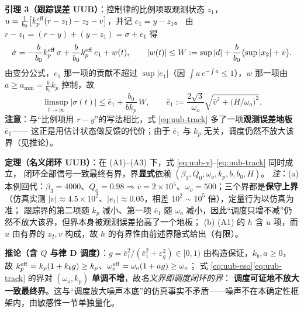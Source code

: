 \documentclass[11pt,a4paper]{article}
\theoremstyle{remark}\newtheorem{remark}{注}
\begin{document}
\noindent\textbf{引理 3（跟踪误差 UUB）}：控制律的比例项取观测状态 $z_1$，
$u=\frac{1}{b_0}\bigl[k_p^{\rm eff}(r-z_1)-z_2-v\bigr]$，并记 $e_1=y-z_1$。
由 $r-z_1=(r-y)+(y-z_1)=\sigma+e_1$ 得
\begin{equation}
\dot\sigma=-\frac{b}{b_0}k_p^{\rm eff}\,\sigma+\frac{b}{b_0}k_p^{\rm eff}\,e_1+w(t),
\qquad
|w(t)|\le W:=\sup|d|+\frac{b}{b_0}\bigl(\sup|x_2|+\bar v\bigr).
\label{eq:sig}
\end{equation}
由变分公式，$e_1$ 那一项的贡献不超过 $\sup|e_1|$（因 $\int a\,e^{-\int a}\le1$），$w$ 那一项由 $a\ge a_{\min}=\frac{b}{b_0}k_p$ 控制，故
\begin{equation}
\limsup_{t\to\infty}|\sigma(t)|
\le \bar e_1+\frac{b_0}{bk_p}\,W,
\qquad
\bar e_1:=\frac{2\sqrt3}{\omega_o}\sqrt{\bar v^{2}+\bigl(H/\omega_o\bigr)^{2}} .
\label{eq:uub-track}
\end{equation}
\textbf{注意}：与“比例项用 $r-y$”的写法相比，式 \eqref{eq:uub-track} 多了一项\textbf{观测误差地板} $\bar e_1$——
这正是用估计状态做反馈的代价；由于 $\bar e_1$ 与 $k_p$ 无关，调度仍然不放大该界（见推论）。

\noindent\textbf{定理（名义闭环 UUB）}：在 (A1)--(A3) 下，式 \eqref{eq:uub-v}--\eqref{eq:uub-track} 同时成立，
闭环全部信号一致最终有界，界\textbf{显式}依赖 $(\beta_3,Q_0,\omega_o,k_p,b,b_0,H)$。
\emph{注}：(a) 本例回代：$\beta_3=4000$、$Q_0=0.98\Rightarrow\bar v=2\times10^{5}$、$\omega_o=500$；三个界都是\textbf{保守上界}
（仿真实测 $|v|\approx4.5\times10^{2}$、$|e_1|\approx0.05$，相差 $10^{2}\sim10^{5}$ 倍），定量行为以仿真为准；
跟踪界的第二项随 $k_p$ 减小、第一项 $\bar e_1$ 随 $\omega_o$ 减小，因此“调度只增不减”仍然不放大该界，但界本身被观测误差抬高了一个地板；
(b) (A1) 的 $h$ 含 $\dot u$ 项，而 $u$ 由有界的 $z_2,v$ 构成，故 $h$ 的有界性由前述界隐式给出（有限）。

\noindent\textbf{推论（含 $Q$ 与律 D 调度）}：$g=\bar e_1^{2}/(\bar e_1^{2}+\varepsilon_g^{2})\in[0,1)$ 由构造保证，$k_b,a\ge0$，
故 $k_p^{\rm eff}=k_p(1+k_b g)\ge k_p$、$\omega_o^{\rm eff}=\omega_o(1+a g)\ge\omega_o$；
式 \eqref{eq:uub-eso}\eqref{eq:uub-track} 的界对 $(\omega_o,k_p)$ \textbf{单调不增}，故\emph{名义界即调度闭环的界}：
\textbf{调度可证地不放大一致最终界}。这与“调度放大噪声本底”的仿真事实不矛盾——噪声不在本确定性框架内，由敏感性一节单独量化。
\end{document}
